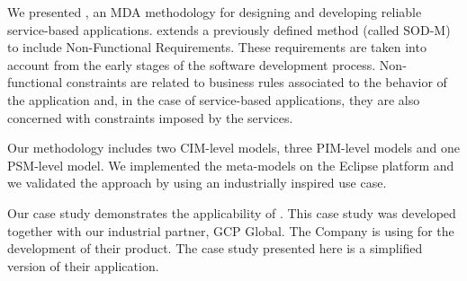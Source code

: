 We presented \pisodm, an MDA methodology for designing and developing reliable service-based applications. 
\pisodm extends a previously defined method (called SOD-M) to include Non-Functional Requirements.
These requirements are taken into account from the early stages of the software development process.
Non-functional constraints are related to business rules associated to the behavior of the application and, in the case of service-based applications, they are also concerned with constraints imposed by the services. 

Our methodology includes two CIM-level models, three PIM-level models and one PSM-level model. 
We implemented the meta-models on the Eclipse platform and we validated the approach by using an industrially inspired use case.

Our case study demonstrates the applicability of \pisodm.
This case study was developed together with our industrial partner, GCP Global.
The Company is using \pisodm for the development of their product.
The case study presented here is a simplified version of their application.